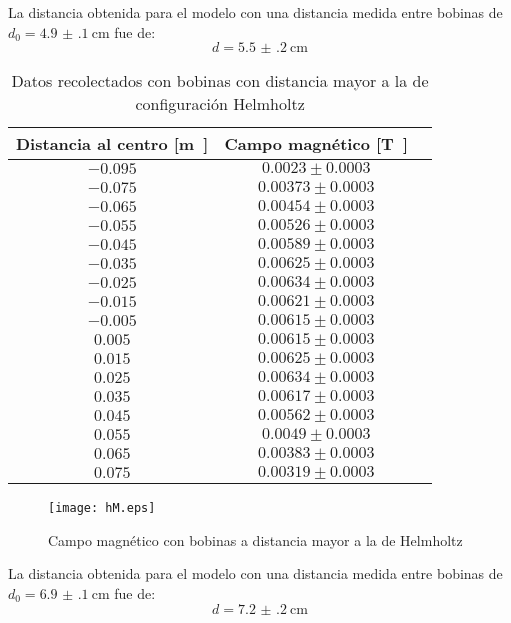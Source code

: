\documentclass[12pt,a4paper]{article}
\begin{document}
La distancia obtenida para el modelo con una distancia medida entre bobinas de $d_0 = \SI{4.9(1)}{\centi\meter}$ fue de: $$d = \SI{5.5(2)}{\centi\meter}$$

\begin{table}[H]
 \centering
 \begin{tabular}{|c|c|c}
Distancia al centro [\si\meter] & Campo magnético [\si\tesla] \\
\hline

$ -0.095 $ & $ 0.0023 \pm 0.0003 $ \\ 
$ -0.075 $ & $ 0.00373 \pm 0.0003 $ \\ 
$ -0.065 $ & $ 0.00454 \pm 0.0003 $ \\ 
$ -0.055 $ & $ 0.00526 \pm 0.0003 $ \\ 
$ -0.045 $ & $ 0.00589 \pm 0.0003 $ \\ 
$ -0.035 $ & $ 0.00625 \pm 0.0003 $ \\ 
$ -0.025 $ & $ 0.00634 \pm 0.0003 $ \\ 
$ -0.015 $ & $ 0.00621 \pm 0.0003 $ \\ 
$ -0.005 $ & $ 0.00615 \pm 0.0003 $ \\ 
$ 0.005 $ & $ 0.00615 \pm 0.0003 $ \\ 
$ 0.015 $ & $ 0.00625 \pm 0.0003 $ \\ 
$ 0.025 $ & $ 0.00634 \pm 0.0003 $ \\ 
$ 0.035 $ & $ 0.00617 \pm 0.0003 $ \\ 
$ 0.045 $ & $ 0.00562 \pm 0.0003 $ \\ 
$ 0.055 $ & $ 0.0049 \pm 0.0003 $ \\ 
$ 0.065 $ & $ 0.00383 \pm 0.0003 $ \\ 
$ 0.075 $ & $ 0.00319 \pm 0.0003 $ \\

 \end{tabular}
\caption{Datos recolectados con bobinas con distancia mayor a la de configuración Helmholtz} 
 \end{table}


\begin{figure}[H]
  \centering
   \texttt{[image: hM.eps]}
\caption{Campo magnético con bobinas a distancia mayor a la de Helmholtz}
  \label{hMplot}
\end{figure}


La distancia obtenida para el modelo con una distancia medida entre bobinas de $d_0 = \SI{6.9(1)}{\centi\meter}$ fue de: $$d = \SI{7.2(2)}{\centi\meter}$$
\end{document}
